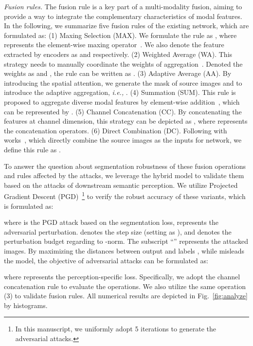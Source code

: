 \documentclass[sigconf]{acmart}
\begin{document}
\textit{Fusion rules.} The fusion rule is a key part of a multi-modality fusion, aiming to provide a way to integrate the complementary characteristics of modal features. In the following, we summarize five fusion rules of the existing network, which are formulated as:
(1) Maxing Selection (MAX). We formulate the rule as , where  represents the element-wise maxing operator~\cite{SeaFusion}. We also denote the feature extracted by encoders as  and  respectively. 
(2) Weighted Average (WA). This strategy needs to manually coordinate  the weights of aggregation~\cite{li2018densefuse,zhao2020didfuse}. Denoted the weights as   and , the rule can be written as  . 
(3) Adaptive Average (AA).  By introducing the spatial attention, we generate the mask of source images  and  to introduce the 
adaptive aggregation, \textit{i.e.,}    . 
(4) Summation (SUM). This rule is proposed to aggregate diverse modal features by element-wise addition~\cite{li2018densefuse,prabhakar2017deepfuse}, which can be represented by .
(5) Channel Concatenation (CC). By concatenating the features at channel dimension, this strategy can be depicted as , where  represents the concatenation operators.
(6) Direct Combination (DC). Following with works~\cite{U2Fusion2020,TarDAL}, which directly combine the source images as the inputs for network, we define this rule
as  .

To answer the question about segmentation robustness of these fusion operations and rules affected by the attacks, we leverage the hybrid model  to validate them based on the attacks    of downstream semantic perception. We utilize Projected Gradient Descent (PGD)~\cite{madry2017towards}\footnote{ {In this manuscript, we uniformly adopt 5 iterations to generate the adversarial attacks.}} to verify the robust accuracy of these variants, which is formulated as:

where  is the PGD attack based on the segmentation loss,  represents the adversarial perturbation.  denotes the step size (setting as ), and  denotes the perturbation budget regarding to -norm. The subscript ``'' represents the attacked images. By maximizing the distances between output  and labels , while misleads the model, the objective of adversarial attacks can be formulated as:

where  represents the perception-specific loss.
Specifically, we adopt the channel concatenation rule to evaluate the operations. 
We also utilize the same operation (3) to validate fusion rules. All numerical results are depicted in Fig.~\ref{fig:analyze} by histograms.
\end{document}
